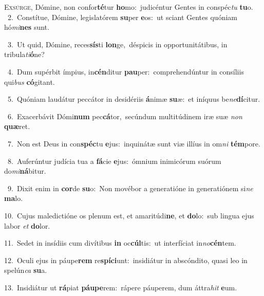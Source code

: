 \lettrine{\initial\textcolor{\initialcolor}{E}}{xsúrge,} Dómine, non confor\-\textbf{té}\-tur \textbf{ho}\-mo:~\star judicéntur Gentes in conspéc\textit{tu} \textbf{tu}\-o.\\
{\numbfont\textcolor{\numbcolor}{~2.}}~Constítue, Dómine, legislatórem \textbf{su}\-per \textbf{e}\-os:~\star ut sciant Gentes quóniam hó\-\textit{mi}\-\textbf{nes} sunt.\par
{\numbfont\textcolor{\numbcolor}{~3.}}~Ut quid, Dómine, reces\-\textbf{sís}\-ti \textbf{lon}\-ge,~\star déspicis in opportunitátibus, in tribula\-\textit{ti}\-\textbf{ó}ne?\par
{\numbfont\textcolor{\numbcolor}{~4.}}~Dum supérbit ímpius, in\-\textbf{cén}\-ditur \textbf{pau}\-per:~\star comprehendúntur in consíliis qui\textit{bus} \textbf{có}\-gitant.\par
{\numbfont\textcolor{\numbcolor}{~5.}}~Quóniam laudátur peccátor in desidériis \textbf{á}\-nimæ \textbf{su}\-æ:~\star et iníquus be\-\textit{ne}\-\textbf{dí}citur.\par
{\numbfont\textcolor{\numbcolor}{~6.}}~Exacerbávit Dómi\textbf{num} pec\-\textbf{cá}\-tor,~\star secúndum multitúdinem iræ suæ \textit{non} \textbf{quæ}\-ret.\par
{\numbfont\textcolor{\numbcolor}{~7.}}~Non est Deus in con\-\textbf{spéc}\-tu \textbf{e}\-jus:~\star inquinátæ sunt viæ illíus in om\textit{ni} \textbf{tém}\-pore.\par
{\numbfont\textcolor{\numbcolor}{~8.}}~Auferúntur judícia tua a \textbf{fá}\-cie \textbf{e}\-jus:~\star ómnium inimicórum suórum do\-\textit{mi}\-\textbf{ná}bitur.\par
{\numbfont\textcolor{\numbcolor}{~9.}}~Dixit enim in \textbf{cor}\-de \textbf{su}\-o:~\star Non movébor a generatióne in generatiónem si\textit{ne} \textbf{ma}\-lo.\par
{\numbfont\textcolor{\numbcolor}{10.}}~Cujus maledictióne os plenum est, et amaritúdi\-\textbf{ne}\-, et \textbf{do}\-lo:~\star sub lingua ejus labor \textit{et} \textbf{do}\-lor.\par
{\numbfont\textcolor{\numbcolor}{11.}}~Sedet in insídiis cum divítibus \textbf{in} oc\-\textbf{cúl}\-tis:~\star ut interfíciat in\-\textit{no}\-\textbf{cén}tem.\par
{\numbfont\textcolor{\numbcolor}{12.}}~Oculi ejus in páupe\textbf{rem} re\-\textbf{spí}\-\textbf{ci}unt:~\star insidiátur in abscóndito, quasi leo in spelún\textit{ca} \textbf{su}\-a.\par
{\numbfont\textcolor{\numbcolor}{13.}}~Insidiátur ut \textbf{rá}\-piat \textbf{páu}\-\textbf{pe}rem:~\star rápere páuperem, dum áttra\textit{hit} \textbf{e}\-um.\par
